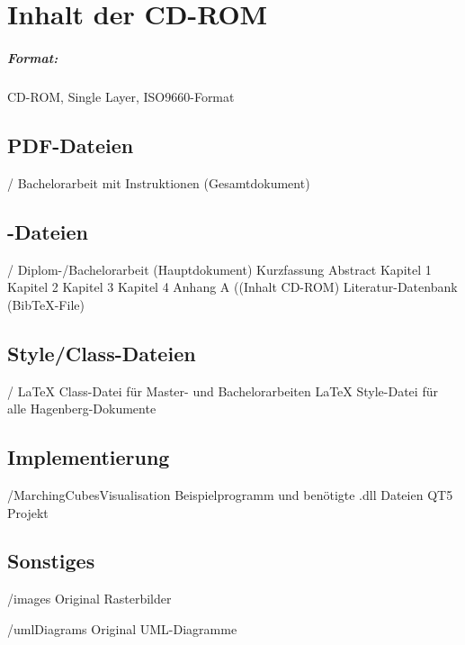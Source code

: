 \chapter{Inhalt der CD-ROM}
\label{app:cdrom}

\paragraph{Format:} 
CD-ROM, Single Layer, ISO9660-Format%

\section{PDF-Dateien}
\begin{FileList}{/}
	 Bachelorarbeit mit Instruktionen (Gesamtdokument)%
\end{FileList}


\section{\latex-Dateien}

\begin{FileList}{/}
	 Diplom-/Bachelorarbeit (Hauptdokument) %
	 Kurzfassung %
	 Abstract %
	 Kapitel 1 %
	 Kapitel 2 %
	 Kapitel 3 %
	 Kapitel 4 %
	 Anhang A ((Inhalt CD-ROM) %
	 Literatur-Datenbank (BibTeX-File)
\end{FileList}

\section{Style/Class-Dateien}

\begin{FileList}{/}
	 LaTeX Class-Datei für Master- und Bachelorarbeiten
	 LaTeX Style-Datei für alle Hagenberg-Dokumente
\end{FileList}


\section{Implementierung}

\begin{FileList}{/MarchingCubesVisualisation}
	 Beispielprogramm und benötigte .dll Dateien
	 QT5 Projekt
	
\end{FileList}

\section{Sonstiges}

\begin{FileList}{/images}
	 Original Rasterbilder %
\end{FileList}

\begin{FileList}{/umlDiagrams}
	 Original UML-Diagramme
\end{FileList}